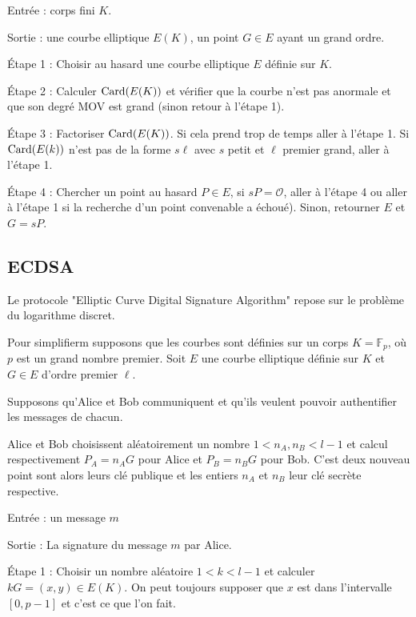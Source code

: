 \begin{algo}
    \cdot Entrée : corps fini $K$.

    \cdot Sortie : une courbe elliptique $E(K)$, un point $G \in E$ ayant un grand ordre.

    \quad Étape 1 : Choisir au hasard une courbe elliptique $E$ définie sur $K$.
    
    \quad Étape 2 : Calculer $\operatorname{Card}(E(K))$ et vérifier que la courbe n'est pas anormale et que
    son degré MOV est grand (sinon retour à l'étape 1).

    \quad Étape 3 : Factoriser $\operatorname{Card}(E(K))$. Si cela prend trop de temps aller à l'étape 1. Si
    $\operatorname{Card}(E(k))$ n'est pas de la forme $s\ell$ avec $s$ petit et $\ell$ premier grand, aller à
    l'étape 1.

    \quad Étape 4 : Chercher un point au hasard $P \in E$, si $sP = \mathcal{O}$, aller à
    l'étape 4 ou aller à l'étape 1 si la recherche d'un point convenable a échoué). Sinon,
    retourner $E$ et $G = sP$.
\end{algo}

\subsection{ECDSA}

Le protocole "Elliptic Curve Digital Signature Algorithm" repose sur le problème du logarithme
discret. 

Pour simplifierm supposons que les courbes sont définies sur un corps $K = \mathbb{F}_{p}$, où
$p$ est un grand nombre premier. Soit $E$ une courbe elliptique définie sur $K$ et $G \in E$
d'ordre premier $\ell$. 

Supposons qu'Alice et Bob communiquent et qu'ils veulent pouvoir authentifier les messages de
chacun.

Alice et Bob choisissent aléatoirement un nombre $1 < n_{A}, n_{B} < l-1$ et calcul
respectivement $P_{A} = n_{A}G$ pour Alice et $P_{B} = n_{B}G$ pour Bob. C'est deux nouveau
point sont alors leurs clé publique et les entiers $n_{A}$ et $n_{B}$ leur clé secrète
respective.


    Entrée : un message $m$ 

    Sortie : La signature du message $m$ par Alice.

    \quad Étape 1 : Choisir un nombre aléatoire $1 < k < l-1$ et calculer $kG = (x,y) \in
    E(K)$. On peut toujours supposer que $x$ est dans l'intervalle $[0,p-1]$ et c'est ce que
    l'on fait.


